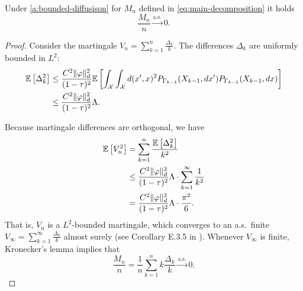 \begin{lemma}
Under \ref{a:bounded-diffusison} for $M_n$ defined in \eqref{eq:main-decomposition} it holds
\[
    \frac{M_n}{n} \xrightarrow{\text{a.s.}} 0.
\]
\begin{proof}
    Consider the martingale $V_n=\sum_{k=1}^n\frac{\Delta_k}{k}$.
    The differences $\Delta_k$ are uniformly bounded in $L^2$:
    \begin{align*}
         \mathbb{E} \left[ \Delta_k^2 \right] &\leq \frac{C^2 \| \varphi \|_{d}^2}{(1- \tau)^2} \mathbb{E} \left[ \int_{\mathcal{X}} \int_{\mathcal{X}} d(x', x)^2
            P_{\Gamma_{k-1}}(X_{k-1}, dx')
            P_{\Gamma_{k-1}}(X_{k-1}, dx)  \right] \\
            &\leq \frac{C^2 \| \varphi \|_{d}^2}{(1- \tau)^2} \Lambda .
    \end{align*}
        
    Because martingale differences are orthogonal, we have
    \begin{align*}
       \mathbb{E} \left[ V_n^2 \right] &=
       \sum_{k=1}^n\frac{\mathbb{E} \left[ \Delta_k^2 \right]}{k^2} \\
       &\leq \frac{C^2 \| \varphi \|_{d}^2}{(1- \tau)^2} \Lambda \cdot\sum_{k=1}^\infty \frac{1}{k^2} \\
       &= \frac{C^2 \| \varphi \|_{d}^2}{(1- \tau)^2} \Lambda \cdot \frac{\pi^2}{6}.
    \end{align*}
    That is, $V_n$ is a $L^2$-bounded martingale, which converges to an a.s.~finite $V_\infty = \sum_{k=1}^\infty\frac{\Delta_k}{k}$ almost surely (see Corollary E.3.5 in \cite{douc2018markov}). Whenever $V_\infty$ is finite, Kronecker's lemma implies that 
    \begin{equation*}
        \frac{M_n}{n}=\frac{1}{n}\sum_{k=1}^n k \frac{\Delta_k}{k}\xrightarrow{\text{a.s.}} 0.
    \end{equation*}
\end{proof}
\end{lemma}


